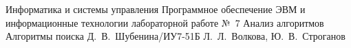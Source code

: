 \makereporttitle
    {Информатика и системы управления} %
    {Программное обеспечение ЭВМ и информационные технологии} %
    {лабораторной работе №~7} %
    {Анализ алгоритмов} %
    {Алгоритмы поиска} %
    {} %
    {Д.~В.~Шубенина/ИУ7-51Б} %
	{Л.~Л.~Волкова, Ю.~В.~Строганов} %
